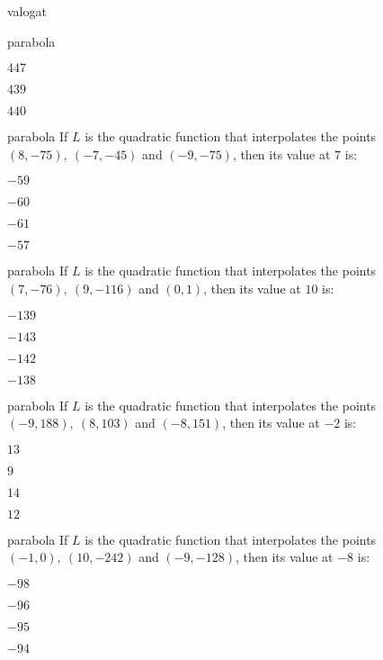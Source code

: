 \documentclass[12pt]{article}
\begin{document}
\begin{quiz}{valogat}
\begin{multi}{parabola}
\item  $ 447 $
\item  $ 439 $
\item  $ 440 $
\end{multi}
\begin{multi}{parabola}
If $L$ is the quadratic function that interpolates the points
$(8,-75),\ (-7,-45)$ and $(-9,-75)$, then its value at $7$ is:
\item* $ -59 $
\item  $ -60 $
\item  $ -61 $
\item  $ -57 $
\end{multi}
\begin{multi}{parabola}
If $L$ is the quadratic function that interpolates the points
$(7,-76),\ (9,-116)$ and $(0,1)$, then its value at $10$ is:
\item* $ -139 $
\item  $ -143 $
\item  $ -142 $
\item  $ -138 $
\end{multi}
\begin{multi}{parabola}
If $L$ is the quadratic function that interpolates the points
$(-9,188),\ (8,103)$ and $(-8,151)$, then its value at $-2$ is:
\item* $ 13 $
\item  $ 9 $
\item  $ 14 $
\item  $ 12 $
\end{multi}
\begin{multi}{parabola}
If $L$ is the quadratic function that interpolates the points
$(-1,0),\ (10,-242)$ and $(-9,-128)$, then its value at $-8$ is:
\item* $ -98 $
\item  $ -96 $
\item  $ -95 $
\item  $ -94 $
\end{multi}
\end{quiz}
\end{document}
